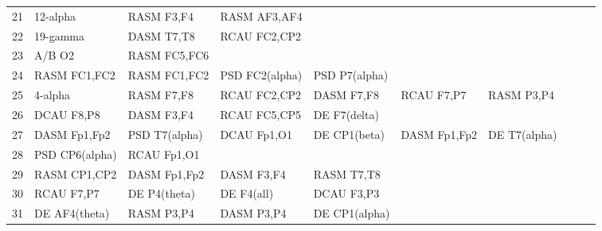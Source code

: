 \begin{landscape}
\begin{table}[]
\begin{tabular}{l|llllllll}
21       & 12-alpha       & RASM F3,F4     & RASM AF3,AF4   &                &                &                &                &                &               &              \\
22       & 19-gamma       & DASM T7,T8     & RCAU FC2,CP2   &                &                &                &                &                &               &              \\
23       & A/B O2         & RASM FC5,FC6   &                &                &                &                &                &                &               &              \\
24       & RASM FC1,FC2   & RASM FC1,FC2   & PSD FC2(alpha) & PSD P7(alpha)  &                &                &                &                &               &              \\
25       & 4-alpha        & RASM F7,F8     & RCAU FC2,CP2   & DASM F7,F8     & RCAU F7,P7     & RASM P3,P4     &                &                &               &              \\
26       & DCAU F8,P8     & DASM F3,F4     & RCAU FC5,CP5   & DE F7(delta)   &                &                &                &                &               &              \\
27       & DASM Fp1,Fp2   & PSD T7(alpha)  & DCAU Fp1,O1    & DE CP1(beta)   & DASM Fp1,Fp2   & DE T7(alpha)   &                &                &               &              \\
28       & PSD CP6(alpha) & RCAU Fp1,O1    &                &                &                &                &                &                &               &              \\
29       & RASM CP1,CP2   & DASM Fp1,Fp2   & DASM F3,F4     & RASM T7,T8     &                &                &                &                &               &              \\
30       & RCAU F7,P7     & DE P4(theta)   & DE F4(all)     & DCAU F3,P3     &                &                &                &                &               &              \\
31       & DE AF4(theta)  & RASM P3,P4     & DASM P3,P4     & DE CP1(alpha)  &                &                &                &                &               &              \\
\end{tabular}
\end{table}
\end{landscape}
\clearpage
